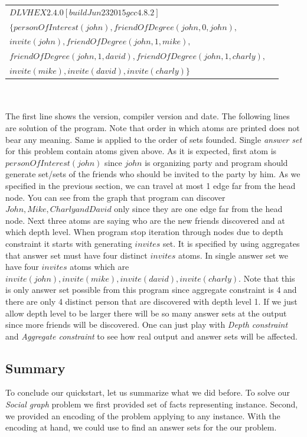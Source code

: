 \documentclass[14pt,a4paper, titlepage]{article}
\begin{document}
\begin{tabular}{ l r }
   $\mathit{ DLVHEX }  \mathit{ 2.4.0 } [ \mathit{ build } \mathit{ Jun } \mathit{ 23 } \mathit{ 2015 }   \mathit{ gcc } \mathit{4.8.2}]$& \\    
   $\mathit{\{personOfInterest(john), friendOfDegree(john,0,john), }$& \\
   $\mathit{invite(john), friendOfDegree(john,1,mike),}$& \\
   $\mathit{friendOfDegree(john,1,david), friendOfDegree(john,1,charly),}$ & \\
   $\mathit{invite(mike),invite(david),invite(charly)\}}$
 \end{tabular}
\\ \\
The first line shows the \dlvhex{} version, compiler version and date. The following lines
are solution of the program. Note that order in which atoms are printed does not bear any meaning. 
Same is applied to the order of sets founded. Single \emph{answer set} for this problem contain 
atoms given above. As it is expected, first atom is $\mathit{personOfInterest(john)}$ 
since $\mathit{john}$ is organizing party and program should generate set/sets of the friends 
who should be invited to the party by him. As we specified in the previous section,
we can travel at most 1 edge far from the head node. You can see from the graph that program 
can discover $\mathit{John, Mike, Charly and David}$ only since they are one edge far from the 
head node. Next three atoms are saying who are the new friends discovered and at which depth 
level. When program stop iteration through nodes due to depth constraint it starts with generating 
$\mathit{invites}$ set. It is specified by using aggregates that answer set must have four distinct $\mathit{invites}$ atoms.
In single answer set we have four $\mathit{invites}$ atoms which are $\mathit{invite(john), 
invite(mike), invite(david), invite(charly)}$. Note that this is only answer set possible 
from this program since aggregate constraint is 4 and there are only 4 distinct person that are discovered with depth level 1. If we just allow depth level to be larger there will be so many answer sets at the output since more friends will be discovered. One can just play with \emph{Depth constraint} and \emph{Aggregate constraint} to see how real output and answer sets will be affected.    

\subsection{Summary}
To conclude our quickstart, let us summarize what we did before. To solve our \emph{Social graph} problem we first provided set of facts representing instance. Second, we provided an encoding of the problem applying to any instance. With the encoding at hand, we could use \dlvhex{} to find an answer sets for the our problem. 
\end{document}
